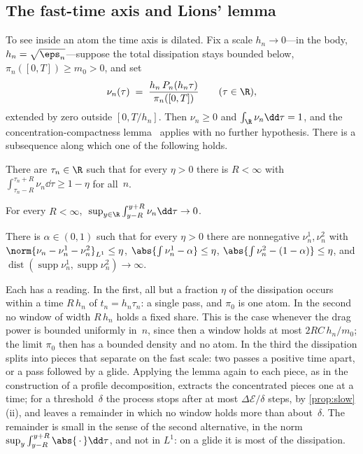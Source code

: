\subsection{The fast-time axis and Lions' lemma}\label{sec:time-fast}

To see inside an atom the time axis is dilated. Fix a scale $h_n\to 0$---in
the body, $h_n=\sqrt{\eps_n}$---suppose the total dissipation stays bounded
below, $\pi_n([0,T])\ge m_0>0$, and set
\[
  \nu_n(\tau) \;=\; \frac{h_n\,P_n(h_n\tau)}{\pi_n([0,T])}
  \qquad(\tau\in\R),
\]
extended by zero outside $[0,T/h_n]$. Then $\nu_n\ge 0$ and
$\int_\R\nu_n\dd\tau = 1$, and the concentration-compactness
lemma~\cite[Lemma~I.1]{lions1984concentration1} applies with no further
hypothesis. There is a subsequence along which one of the following holds.
\begin{description}[leftmargin=1.5em,itemsep=2pt]
  \item[Compactness.] There are $\tau_n\in\R$ such that for every
    $\eta>0$ there is $R<\infty$ with
    $\int_{\tau_n-R}^{\tau_n+R}\nu_n\dd\tau \ge 1-\eta$ for all~$n$.
  \item[Vanishing.] For every $R<\infty$,
    $\;\sup_{y\in\R}\int_{y-R}^{y+R}\nu_n\dd\tau \to 0$.
  \item[Dichotomy.] There is $\alpha\in(0,1)$ such that for every $\eta>0$
    there are nonnegative $\nu_n^1,\nu_n^2$ with
    $\norm{\nu_n - \nu_n^1 - \nu_n^2}_{L^1}\le\eta$,
    $\abs{\int\nu_n^1 - \alpha}\le\eta$,
    $\abs{\int\nu_n^2 - (1-\alpha)}\le\eta$, and
    $\operatorname{dist}(\operatorname{supp}\nu_n^1,
    \operatorname{supp}\nu_n^2)\to\infty$.
\end{description}

Each has a reading. In the first, all but a fraction $\eta$ of the
dissipation occurs within a time $R\,h_n$ of $t_n = h_n\tau_n$: a single
pass, and $\pi_0$ is one atom. In the second no window of width $R\,h_n$
holds a fixed share. This is the case whenever the drag power is bounded
uniformly in~$n$, since then a window holds at most $2RC\,h_n/m_0$; the
limit $\pi_0$ then has a bounded density and no atom. In the third the
dissipation splits into pieces that separate on the fast scale: two passes
a positive time apart, or a pass followed by a glide. Applying the lemma
again to each piece, as in the construction of a profile decomposition,
extracts the concentrated pieces one at a time; for a threshold~$\delta$
the process stops after at most $\Delta\mathcal{E}/\delta$ steps, by
\cref{prop:slow}(ii), and leaves a remainder in which no window holds more
than about~$\delta$. The remainder is small in the sense of the second
alternative, in the norm $\sup_y\int_{y-R}^{y+R}\abs{\,\cdot\,}\dd\tau$,
and not in $L^1$: on a glide it is most of the dissipation.

